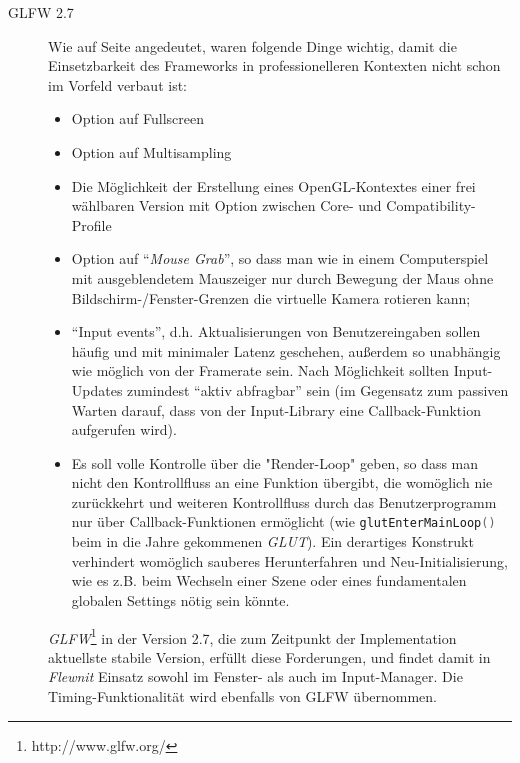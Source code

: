 \begin{description}
    	
   		\item[GLFW 2.7]
		Wie auf Seite \pageref{focus:dependencies} angedeutet, waren folgende Dinge wichtig, damit die Einsetzbarkeit
		des Frameworks in professionelleren Kontexten nicht schon im Vorfeld verbaut ist:
		\begin{itemize}
			\item Option auf Fullscreen
			\item Option auf Multisampling
			\item Die Möglichkeit der Erstellung eines OpenGL-Kontextes einer frei wählbaren Version 
			mit Option zwischen Core- und Compatibility-Profile
			\item Option auf "`\emph{Mouse Grab}"', so dass man wie in einem Computerspiel mit ausgeblendetem Mauszeiger
			nur durch Bewegung der Maus ohne Bildschirm-/Fenster-Grenzen die virtuelle Kamera rotieren kann;
			\item "`Input events"', d.h. Aktualisierungen von Benutzereingaben sollen häufig und mit minimaler 
			Latenz geschehen, außerdem so unabhängig wie möglich von der Framerate sein.
			Nach Möglichkeit sollten Input-Updates zumindest "`aktiv abfragbar"' sein 
			(im Gegensatz zum passiven Warten darauf, dass von der Input-Library eine Callback-Funktion 
			aufgerufen wird).
			\item Es soll volle Kontrolle über die "Render-Loop" geben, so dass man nicht 
			den Kontrollfluss an eine Funktion übergibt, die womöglich nie zurückkehrt und weiteren Kontrollfluss
			durch das Benutzerprogramm	nur über Callback-Funktionen ermöglicht
			(wie \lstinline[language=C]|glutEnterMainLoop()| beim in die Jahre gekommenen \emph{GLUT}).
			Ein derartiges Konstrukt verhindert womöglich sauberes Herunterfahren und Neu-Initialisierung,
			wie es z.B. beim Wechseln einer Szene oder eines fundamentalen globalen Settings nötig sein könnte.	
		\end{itemize}
		\emph{GLFW}\footnote{http://www.glfw.org/} in der Version 2.7, die zum Zeitpunkt der Implementation aktuellste 
		stabile	Version, erfüllt diese Forderungen, und findet damit in \emph{Flewnit} Einsatz sowohl im Fenster- als auch 	
		im Input-Manager. Die Timing-Funktionalität wird ebenfalls von GLFW übernommen.
		

\end{description}
